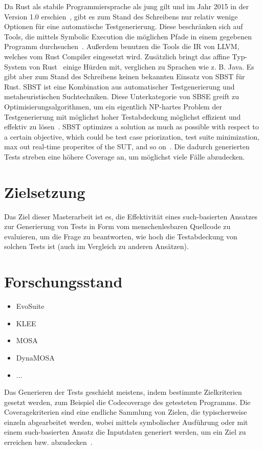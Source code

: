 \documentclass{article}
\begin{document}
Da Rust als stabile Programmiersprache als jung gilt und im Jahr 2015 in der Version 1.0 erschien~\cite{Rust10}, gibt es zum Stand des Schreibens nur relativ wenige Optionen für eine automatische Testgenerierung. Diese beschränken sich auf Tools, die mittels Symbolic Execution die möglichen Pfade in einem gegebenen Programm durchsuchen~\cite{cadar2008klee}.  Außerdem benutzen die Tools die IR von LLVM, welches vom Rust Compiler eingesetzt wird. Zusätzlich bringt das affine Typ-System von Rust~\cite{Anderson2016} einige Hürden mit, verglichen zu Sprachen wie z. B. Java. Es gibt aber zum Stand des Schreibens keinen bekannten Einsatz von SBST für Rust. SBST ist eine Kombination aus automatischer Testgenerierung und metaheuristischen Suchtechniken. Diese Unterkategorie von SBSE greift zu Optimisierungsalgorithmen, um ein eigentlich NP-hartes Problem der Testgenerierung mit möglichst hoher Testabdeckung möglichst effizient und effektiv zu lösen~\cite{Khari2019}. SBST optimizes a solution as much as possible with respect to a certain objective, which could be test case priorization, test suite minimization, max out real-time properites of the SUT, and so on~\cite{Khari2019}. Die dadurch generierten Tests streben eine höhere Coverage an, um möglichst viele Fälle abzudecken. 


\section{Zielsetzung}
Das Ziel dieser Masterarbeit ist es, die Effektivität eines such-basierten Ansatzes zur Generierung von Tests in Form vom menschenlesbaren Quellcode zu evaluieren, um die Frage zu beantworten, wie hoch die Testabdeckung von solchen Tests ist (auch im Vergleich zu anderen Ansätzen).


\section{Forschungsstand}
\begin{itemize}
    \item EvoSuite
    \item KLEE
    \item MOSA
    \item DynaMOSA
    \item ... 
\end{itemize}
Das Generieren der Tests geschieht meistens, indem bestimmte Zielkriterien gesetzt werden, zum Beispiel die Codecoverage des getesteten Programms. Die Coveragekriterien sind eine endliche Sammlung von Zielen, die typischerweise einzeln abgearbeitet werden, wobei mittels symbolischer Ausführung oder mit einem such-basierten Ansatz die Inputdaten generiert werden, um ein Ziel zu erreichen bzw. abzudecken~\cite{Fraser_2013}. 
\end{document}
